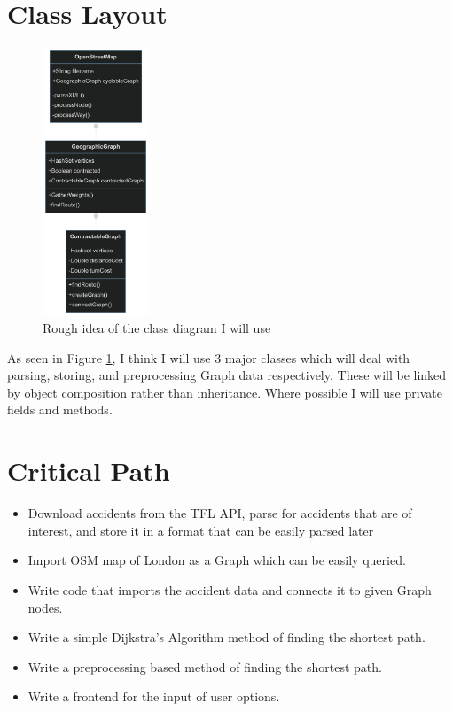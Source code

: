 \documentclass[11pt,twoside,a4paper]{report}
\begin{document}
\section{Class Layout}
\begin{figure}[t]
    \begin{center}
    \includegraphics[height=8cm]{classdiagram.png}
    \end{center}
    \caption{Rough idea of the class diagram I will use}
    \label{Class Diagram Simple}
\end{figure}
As seen in Figure \ref{Class Diagram Simple}, I think I will use 3 major classes which will deal with parsing, storing, and preprocessing Graph data respectively. These will be linked by object composition
rather than inheritance. Where possible I will use private fields and methods. 
\section{Critical Path}
\begin{itemize} 
    \item Download accidents from the TFL API, parse for accidents that are of interest, and store it in a format that can be easily parsed later
    \item Import OSM map of London as a Graph which can be easily queried.
    \item Write code that imports the accident data and connects it to given Graph nodes.
    \item Write a simple Dijkstra's Algorithm method of finding the shortest path.
    \item Write a preprocessing based method of finding the shortest path.
    \item Write a frontend for the input of user options.
\end{itemize}
\newpage
\end{document}
